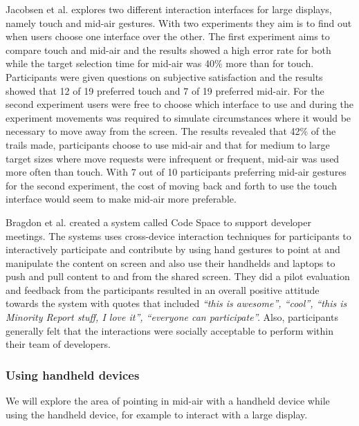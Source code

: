 Jacobsen et al. explores two different interaction interfaces for large displays, namely touch and mid-air gestures.
With two experiments they aim is to find out when users choose one interface over the other.
The first experiment aims to compare touch and mid-air and the results showed a high error rate for both while the target selection time for mid-air was 40\% more than for touch.
Participants were given questions on subjective satisfaction and the results showed that 12 of 19 preferred touch and 7 of 19 preferred mid-air.
For the second experiment users were free to choose which interface to use and during the experiment movements was required to simulate circumstances where it would be necessary to move away from the screen.
The results revealed that 42\% of the trails made, participants choose to use mid-air and that for medium to large target sizes where move requests were infrequent or frequent, mid-air was used more often than touch.
With 7 out of 10 participants preferring mid-air gestures for the second experiment, the cost of moving back and forth to use the touch interface would seem to make mid-air more preferable.

Bragdon et al. \cite{Bragdon:2011} created a system called Code Space to support developer meetings.
The systems uses cross-device interaction techniques for participants to interactively participate and contribute by using hand gestures to point at and manipulate the content on screen and also use their handhelds and laptops to push and pull content to and from the shared screen.
They did a pilot evaluation and feedback from the participants resulted in an overall positive attitude towards the system with quotes that included \textit{``this is awesome'', ``cool'', ``this is Minority Report stuff, I love it'', ``everyone can participate''.}
Also, participants generally felt that the interactions were socially acceptable to perform within their team of developers.

\subsubsection{Using handheld devices} \label{sec:midAirPointingHandheld}
We will explore the area of pointing in mid-air with a handheld device while using the handheld device, for example to interact with a large display.

